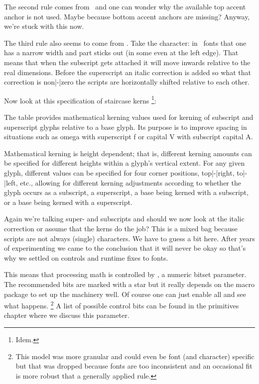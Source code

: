 The second rule comes from \TEX\ and one can wonder why the available top accent
anchor is not used. Maybe because bottom accent anchors are missing? Anyway,
we're stuck with this now.

The third rule also seems to come from \TEX. Take the  character:
in \TEX\ fonts that one has a narrow width and part sticks out (in some even at
the left edge). That means that when the subscript gets attached it will move
inwards relative to the real dimensions. Before the superscript an italic
correction is added so what that correction is non|-|zero the scripts are
horizontally shifted relative to each other.

Now look at this specification of staircase kerns \footnote {Idem.}:

\startnarrower
    The  table provides mathematical kerning values used for
    kerning of subscript and superscript glyphs relative to a base glyph. Its
    purpose is to improve spacing in situations such as omega with superscript f
    or capital V with subscript capital A.

    Mathematical kerning is height dependent; that is, different kerning amounts
    can be specified for different heights within a glyph’s vertical extent. For
    any given glyph, different values can be specified for four corner positions,
    top|-|right, to|-|left, etc., allowing for different kerning adjustments
    according to whether the glyph occurs as a subscript, a superscript, a base
    being kerned with a subscript, or a base being kerned with a superscript.
\stopnarrower

Again we're talking super- and subscripts and should we now look at the italic
correction or assume that the kerns do the job? This is a mixed bag because
scripts are not always (single) characters. We have to guess a bit here. After
years of experimenting we came to the conclusion that it will never be okay so
that's why we settled on controls and runtime fixes to fonts.

This means that processing math is controlled by \typ {\mathfontcontrol}, a
numeric bitset parameter. The recommended bits are marked with a star but it
really depends on the macro package to set up the machinery well. Of course one
can just enable all and see what happens. \footnote {This model was more granular
and could even be font (and character) specific but that was dropped because
fonts are too inconsistent and an occasional fit is more robust that a generally
applied rule.} A list of possible control bits can be found in the primitives
chapter where we discuss this parameter.

